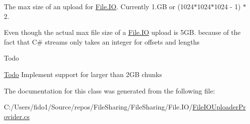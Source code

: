 The max size of an upload for \hyperlink{namespace_file_sharing_1_1_file_1_1_i_o}{File.\+IO}. Currently 1.\+GB or (1024$\ast$1024$\ast$1024 -\/ 1) $\ast$ 2. 

Even though the actual max file size of a \hyperlink{namespace_file_sharing_1_1_file_1_1_i_o}{File.\+IO} upload is 5\+GB. because of the fact that C\# streams only takes an integer for offsets and lengths \begin{DoxyRefDesc}{Todo}
\item[\hyperlink{todo__todo000001}{Todo}]Implement support for larger than 2\+GB chunks \end{DoxyRefDesc}


The documentation for this class was generated from the following file\+:\begin{DoxyCompactItemize}
\item 
C\+:/\+Users/fido1/\+Source/repos/\+File\+Sharing/\+File\+Sharing/\+File.\+I\+O/\hyperlink{_file_i_o_uploader_provider_8cs}{File\+I\+O\+Uploader\+Provider.\+cs}\end{DoxyCompactItemize}
